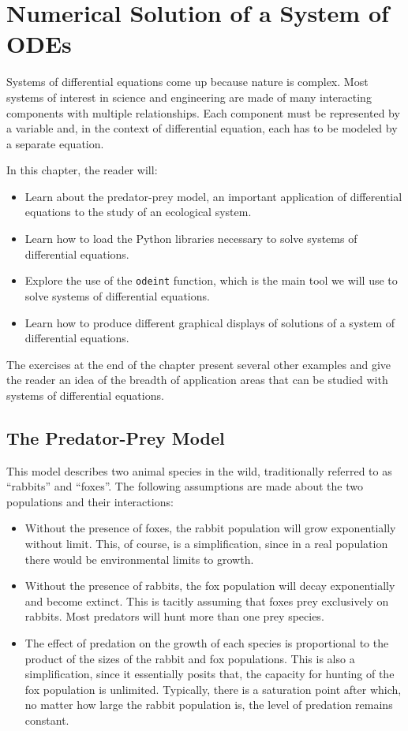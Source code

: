 
\chapter{Numerical Solution of a System of ODEs}

Systems of differential equations come up because nature is complex. Most systems of interest in science and engineering are made of many interacting components with multiple relationships. Each component must be represented by a variable and, in the context of differential equation, each has to be modeled by a separate equation.

In this chapter, the reader will:

\begin{itemize}
\item Learn about the predator-prey model, an important application of differential equations to the study of an ecological system.
\item Learn how to load the Python libraries necessary to solve systems of differential equations.
\item Explore the use of the \texttt{odeint} function, which is the main tool we will use to solve systems of differential equations.
\item Learn how to produce different graphical displays of solutions of a system of differential equations.
\end{itemize}

The exercises at the end of the chapter present several other examples and give the reader an idea of the breadth of application areas that can be studied with systems of differential equations.

\section{The Predator-Prey Model}

This model describes two animal species in the wild, traditionally referred to as ``rabbits'' and ``foxes''. The following assumptions are made about the two populations and their interactions:

\begin{itemize}
\item Without the presence of foxes, the rabbit population will grow exponentially without limit. This, of course, is a simplification, since in a real population there would be environmental limits to growth.
\item Without the presence of rabbits, the fox population will decay exponentially and become extinct. This is tacitly assuming that foxes prey exclusively on rabbits. Most predators will hunt more than one prey species.
\item The effect of predation on the growth of each species is proportional to the product of the sizes of the rabbit and fox populations. This is also  a simplification, since it essentially posits that, the capacity for hunting of the fox population is unlimited. Typically, there is a saturation point after which, no matter how large the rabbit population is, the level of predation remains constant.
\end{itemize}

